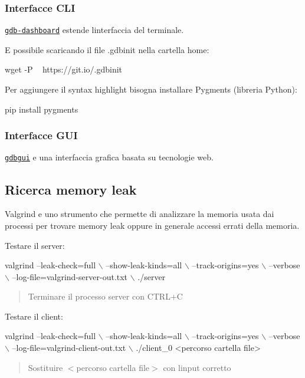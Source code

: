 \subsubsection*{Interfacce C\+LI}

\href{https://github.com/cyrus-and/gdb-dashboard}{\tt gdb-\/dashboard} estende l\textquotesingle{}interfaccia del terminale.



E\textquotesingle{} possibile scaricando il file {\ttfamily .gdbinit} nella cartella home\+: 
\begin{DoxyCode}
wget -P ~ https://git.io/.gdbinit
\end{DoxyCode}


Per aggiungere il syntax highlight bisogna installare Pygments (libreria Python)\+: 
\begin{DoxyCode}
pip install pygments
\end{DoxyCode}


\subsubsection*{Interfacce G\+UI}

\href{https://github.com/cs01/gdbgui}{\tt gdbgui} e\textquotesingle{} una interfaccia grafica basata su tecnologie web.



\subsection*{Ricerca memory leak}

Valgrind e\textquotesingle{} uno strumento che permette di analizzare la memoria usata dai processi per trovare memory leak oppure in generale accessi errati della memoria.

Testare il server\+: 
\begin{DoxyCode}
valgrind --leak-check=full \(\backslash\)
    --show-leak-kinds=all \(\backslash\)
    --track-origins=yes \(\backslash\)
    --verbose \(\backslash\)
    --log-file=valgrind-server-out.txt \(\backslash\)
    ./server
\end{DoxyCode}
 \begin{quote}
Terminare il processo server con C\+T\+R\+L+C \end{quote}


Testare il client\+: 
\begin{DoxyCode}
valgrind --leak-check=full \(\backslash\)
    --show-leak-kinds=all \(\backslash\)
    --track-origins=yes \(\backslash\)
    --verbose \(\backslash\)
    --log-file=valgrind-client-out.txt \(\backslash\)
    ./client\_0 <percorso cartella file>
\end{DoxyCode}
 \begin{quote}
Sostituire {\ttfamily $<$percorso cartella file$>$} con l\textquotesingle{}input corretto \end{quote}


